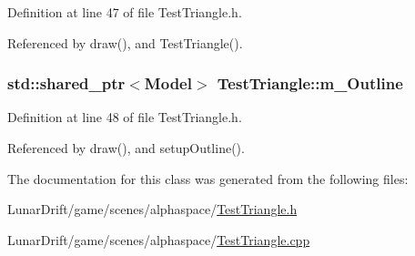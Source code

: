 Definition at line 47 of file Test\+Triangle.\+h.



Referenced by draw(), and Test\+Triangle().

\subsubsection[{\texorpdfstring{m\+\_\+\+Outline}{m_Outline}}]{\setlength{\rightskip}{0pt plus 5cm}std\+::shared\+\_\+ptr$<${\bf Model}$>$ Test\+Triangle\+::m\+\_\+\+Outline\hspace{0.3cm}{\ttfamily [private]}}\hypertarget{class_test_triangle_a6613fd705070b8663027cc14cd542e81}{}\label{class_test_triangle_a6613fd705070b8663027cc14cd542e81}


Definition at line 48 of file Test\+Triangle.\+h.



Referenced by draw(), and setup\+Outline().



The documentation for this class was generated from the following files\+:\begin{DoxyCompactItemize}
\item 
Lunar\+Drift/game/scenes/alphaspace/\hyperlink{_test_triangle_8h}{Test\+Triangle.\+h}\item 
Lunar\+Drift/game/scenes/alphaspace/\hyperlink{_test_triangle_8cpp}{Test\+Triangle.\+cpp}\end{DoxyCompactItemize}
